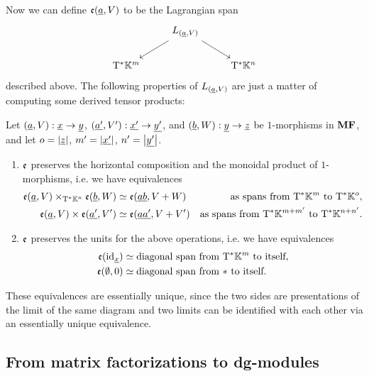 Now we can define $\mathfrak{e}(\underline{a},V)$ to be the Lagrangian span
\begin{equation*}
	\begin{tikzcd}
		& L_{(\undl{a}, V)} \ar[dl] \ar[dr] & \\
		\bT^\ast \KK^m & & \bT^\ast \KK^n
	\end{tikzcd}
\end{equation*}
described above. The following properties of $L_{(\underline{a},V)}$ are just a matter of computing some derived tensor products:
\begin{prp} \label{prp:functoriality-1cells}
	Let $(\underline{a}, V) : \underline{x} \to \underline{y}$, $(\underline{a'}, V') : \underline{x'} \to \underline{y'}$, and $(\underline{b}, W) : \underline{y} \to \underline{z}$ be $1$-morphisms in $\mathbf{MF}$, and let $o = \left\lvert \underline{z} \right\rvert$, $m' = \left\lvert \underline{x'} \right\rvert$, $n' = \left\lvert \underline{y'} \right\rvert$. 
	\begin{enumerate}
		\item $\mathfrak{e}$ preserves the horizontal composition and the monoidal product of $1$-morphisms, i.e. we have equivalences
		\begin{align*}
			\mathfrak{e}(\underline{a}, V) \times_{\mathrm{T}^\ast \mathbb{K}^{n}} \mathfrak{e}(\underline{b}, W) & \simeq \mathfrak{e}(\underline{ab}, V + W) & \text{as spans from $\mathrm{T}^\ast \mathbb{K}^m$ to $\mathrm{T}^\ast \mathbb{K}^o$}, \\
			\mathfrak{e}(\underline{a}, V) \times \mathfrak{e}(\underline{a'}, V') & \simeq \mathfrak{e}(\underline{aa'}, V + V') & \text{as spans from $\mathrm{T}^\ast \mathbb{K}^{m+m'}$ to $\mathrm{T}^\ast \mathbb{K}^{n+n'}$}.
		\end{align*}
		\item $\mathfrak{e}$ preserves the units for the above operations, i.e. we have equivalences
		\begin{align*}
			\mathfrak{e}(\mathrm{id}_{\underline{x}}) & \simeq \text{diagonal span from $\mathrm{T}^\ast \mathbb{K}^m$ to itself}, \\
			\mathfrak{e}(\emptyset, 0) & \simeq \text{diagonal span from $\ast$ to itself}.
		\end{align*}
	\end{enumerate}
\end{prp}
These equivalences are essentially unique, since the two sides are presentations of the limit of the same diagram and two limits can be identified with each other via an essentially unique equivalence.

\subsection{From matrix factorizations to dg-modules}

